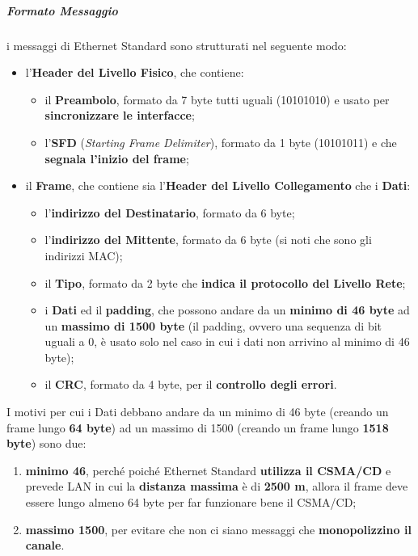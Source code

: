 \documentclass[a4paper]{article}
\begin{document}
					\subparagraph{Formato Messaggio}					
						i messaggi di Ethernet Standard sono strutturati nel seguente modo:
						\begin{itemize}
							\item l'\textbf{Header del Livello Fisico}, che contiene:
							\begin{itemize}
								\item il \textbf{Preambolo}, formato da 7 byte tutti uguali (10101010) e usato per \textbf{sincronizzare le interfacce};
								\item l'\textbf{SFD} (\emph{Starting Frame Delimiter}), formato da 1 byte (10101011) e che \textbf{segnala l'inizio del frame};
							\end{itemize}
							\item il \textbf{Frame}, che contiene sia l'\textbf{Header del Livello Collegamento} che i \textbf{Dati}:
							\begin{itemize}
								\item l'\textbf{indirizzo del Destinatario}, formato da 6 byte;
								\item l'\textbf{indirizzo del Mittente}, formato da 6 byte (si noti che sono gli indirizzi MAC);
								\item il \textbf{Tipo}, formato da 2 byte che \textbf{indica il protocollo del Livello Rete};
								\item i \textbf{Dati} ed il \textbf{padding}, che possono andare da un \textbf{minimo di 46 byte} ad un \textbf{massimo di 1500 byte} (il padding, ovvero una sequenza di bit uguali a 0, è usato solo nel caso in cui i dati non arrivino al minimo di 46 byte);
								\item il \textbf{CRC}, formato da 4 byte, per il \textbf{controllo degli errori}.
							\end{itemize}
						\end{itemize}
					
						I motivi per cui i Dati debbano andare da un minimo di 46 byte (creando un frame lungo \textbf{64 byte}) ad un massimo di 1500 (creando un frame lungo \textbf{1518 byte}) sono due:
						\begin{enumerate}
							\item \textbf{minimo 46}, perché poiché Ethernet Standard \textbf{utilizza il CSMA/CD} e prevede LAN in cui la \textbf{distanza massima} è di \textbf{2500 m}, allora il frame deve essere lungo almeno 64 byte per far funzionare bene il CSMA/CD;
							\item \textbf{massimo 1500}, per evitare che non ci siano messaggi che \textbf{monopolizzino il canale}.
						\end{enumerate}
						
\end{document}

